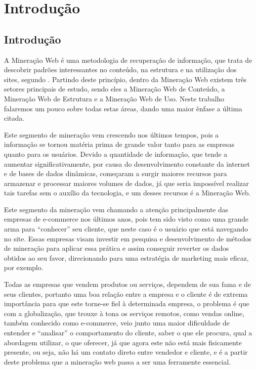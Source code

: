 \chapter{Introdução}

\section{Introdução}
    A Mineração Web é uma metodologia de recuperação de informação, que trata de descobrir padrões interessantes no conteúdo, na estrutura e na utilização dos sites, segundo \cite{Escobar}. Partindo deste princípio, dentro da Mineração Web existem três setores principais de estudo, sendo eles a Mineração Web de Conteúdo, a Mineração Web de Estrutura e a Mineração Web de Uso. Neste trabalho falaremos um pouco sobre todas estas áreas, dando uma maior ênfase a última citada.

    Este segmento de mineração vem crescendo nos últimos tempos, pois a informação se tornou matéria prima de grande valor tanto para as empresas quanto para os usuários. Devido a quantidade de informação, que tende a aumentar significativamente, por causa do desenvolvimento constante da internet e de bases de dados dinâmicas, começaram a surgir maiores recursos para armazenar e processar maiores volumes de dados, já que seria impossível realizar tais tarefas sem o auxílio da tecnologia, e um desses recursos é a Mineração Web.

	Este segmento da mineração vem chamando a atenção principalmente das empresas de e-commerce nos últimos anos, pois tem sido visto como uma grande arma para “conhecer” seu cliente, que neste caso é o usuário que está navegando no site. Essas empresas visam investir em pesquisa e desenvolvimento de métodos de mineração para aplicar essa prática e assim conseguir reverter os dados obtidos ao seu favor, direcionando para uma estratégia de marketing mais eficaz, por exemplo.

	Todas as empresas que vendem produtos ou serviços, dependem de sua fama e de seus clientes, portanto uma boa relação entre a empresa e o cliente é de extrema importância para que este torne-se fiel à determinada empresa, o problema é que com a globalização, que trouxe à tona os serviços remotos, como vendas online, também conhecido como e-commerce, veio junto uma maior dificuldade de entender e “analisar” o comportamento do cliente, saber o que ele procura, qual a abordagem utilizar, o que oferecer, já que agora este não está mais fisicamente presente, ou seja, não há um contato direto entre vendedor e cliente, e é a partir deste problema que a mineração web passa a ser uma ferramente essencial.

